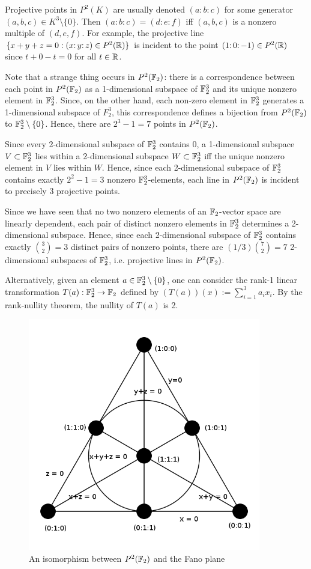 \documentclass{article}
\begin{document}
Projective points in $P^2(K)$ are usually denoted $(a\mathpunct{:}b\mathpunct{:}c)$ for some generator $(a,b,c) \in K^3\setminus \{0\}$. Then $(a\mathpunct{:}b\mathpunct{:}c) = (d\mathpunct{:}e\mathpunct{:}f)$ iff $(a,b,c)$ is a nonzero multiple of $(d,e,f)$. For example, the projective line $\{x+y+z=0: (x \mathpunct{:}y\mathpunct{:}z) \in P^2(\mathbb{R})\}$ is incident to the point $(1\mathpunct{:}0\mathpunct{:}-1) \in P^2(\mathbb{R})$ since $t+0-t = 0$ for all $t\in \mathbb{R}$.

Note that a strange thing occurs in $P^2(\mathbb{F}_2)$: there is a correspondence between each point in $P^2(\mathbb{F}_2)$ as a 1-dimensional subspace of $\mathbb{F}_2^3$ and its unique nonzero element in $\mathbb{F}_2^3$. Since, on the other hand, each non-zero element in $\mathbb{F}_2^3$ generates a 1-dimensional subspace of $F_2^3$, this correspondence defines a bijection from $P^2(\mathbb{F}_2)$ to $\mathbb{F}_2^3\setminus \{0\}$. Hence, there are $2^3 - 1 = 7$ points in $P^2(\mathbb{F}_2)$. 

Since every 2-dimensional subspace of $\mathbb{F}_2^3$ contains 0, a 1-dimensional subspace $V \subset \mathbb{F}_2^3$ lies within a 2-dimensional subspace $W \subset \mathbb{F}_2^3$ iff the unique nonzero element in $V$ lies within $W$. Hence, since each 2-dimensional subspace of $\mathbb{F}_2^3$ contains exactly $2^2 - 1 = 3$ nonzero $\mathbb{F}_2^3$-elements, each line in $P^2(\mathbb{F}_2)$ is incident to precisely 3 projective points.

Since we have seen that no two nonzero elements of an $\mathbb{F}_2$-vector space are linearly dependent, each pair of distinct nonzero elements in $\mathbb{F}_2^3$ determines a 2-dimensional subspace. Hence, since each 2-dimensional subspace of $\mathbb{F}_2^3$ contains exactly ${3 \choose 2} = 3$ distinct pairs of nonzero points, there are
$(1/3) {7 \choose 2} = 7$ 2-dimensional subspaces of $\mathbb{F}_2^3$, i.e. projective lines in $P^2(\mathbb{F}_2)$.

Alternatively, given an element $a \in \mathbb{F}_2^3\setminus \{0\}$, one can consider the rank-1 linear transformation $T(a):\mathbb{F}_2^3 \to \mathbb{F}_2$ defined by $(T(a))(x) := \sum_{i=1}^3 a_ix_i$.  By the rank-nullity theorem, the nullity of $T(a)$ is 2.



\begin{figure}[h]
\centering
\includegraphics[width=4in]{Fano_plane.png}
\caption{An isomorphism between $P^2(\mathbb{F}_2)$ and the Fano plane}
\end{figure}





\end{document}
